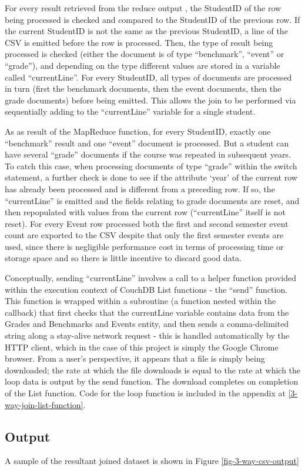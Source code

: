 For every result retrieved from the reduce output , the StudentID of the row being processed is checked and compared to the StudentID of the previous row. If the current StudentID is not the same as the previous StudentID, a line of the CSV is emitted before the row is processed. Then, the type of result being processed is checked (either the document is of type ``benchmark'', ``event'' or ``grade''), and depending on the type different values are stored in a variable called ``currentLine''. For every StudentID, all types of documents are processed in turn (first the benchmark documents, then the event documents, then the grade documents) before being emitted. This allows the join to be performed via sequentially adding to the ``currentLine'' variable for a single student.

As as result of the MapReduce function, for every StudentID, exactly one ``benchmark'' result and one ``event'' document is processed. But a student can have several ``grade'' documents if the course was repeated in subsequent years. To catch this case, when processing documents of type ``grade'' within the switch statement, a further check is done to see if the attribute `year' of the current row has already been processed and is different from a preceding row. If so, the ``currentLine'' is emitted and the fields relating to grade documents are reset, and then repopulated with values from the current row (``currentLine'' itself is not reset). For every Event row processed both the first and second semester event count are exported to the CSV despite that only the first semester events are used, since there is negligible performance cost in terms of processing time or storage space and so there is little incentive to discard good data.

Conceptually, sending ``currentLine'' involves a call to a helper function provided within the execution context of CouchDB List functions - the ``send'' function. This function is wrapped within a subroutine (a function nested within the callback) that first checks that the currentLine variable contains data from the Grades and Benchmarks and Events entity, and then sends a comma-delimited string along a stay-alive network request - this is handled automatically by the HTTP client, which in the case of this project is simply the Google Chrome browser. From a user's perspective, it appears that a file is simply being downloaded; the rate at which the file downloads is equal to the rate at which the loop data is output by the send function. The download completes on completion of the List function. Code for the loop function is included in the appendix at \ref{3-way-join-list-function}.



\subsection{Output}
A sample of the resultant joined dataset is shown in Figure \ref{fig-3-way-csv-output}
